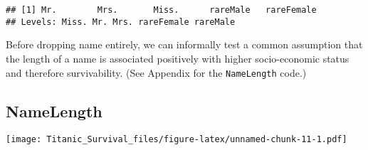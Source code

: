 \documentclass[]{article}
\newenvironment{Shaded}{\begin{snugshade}}{\end{snugshade}}
\newcommand{\KeywordTok}[1]{\textcolor[rgb]{0.13,0.29,0.53}{\textbf{#1}}}
\newcommand{\DecValTok}[1]{\textcolor[rgb]{0.00,0.00,0.81}{#1}}
\newcommand{\StringTok}[1]{\textcolor[rgb]{0.31,0.60,0.02}{#1}}
\newcommand{\CommentTok}[1]{\textcolor[rgb]{0.56,0.35,0.01}{\textit{#1}}}
\newcommand{\ControlFlowTok}[1]{\textcolor[rgb]{0.13,0.29,0.53}{\textbf{#1}}}
\newcommand{\OperatorTok}[1]{\textcolor[rgb]{0.81,0.36,0.00}{\textbf{#1}}}
\newcommand{\NormalTok}[1]{#1}
\begin{document}
\begin{Shaded}
\end{Shaded}

\begin{verbatim}
## [1] Mr.        Mrs.       Miss.      rareMale   rareFemale
## Levels: Miss. Mr. Mrs. rareFemale rareMale
\end{verbatim}

Before dropping name entirely, we can informally test a common
assumption that the length of a name is associated positively with
higher socio-economic status and therefore survivability. (See Appendix
for the \texttt{NameLength} code.)

\subsection{NameLength}\label{namelength}

\texttt{[image: Titanic\_Survival\_files/figure-latex/unnamed-chunk-11-1.pdf]}
\end{document}
